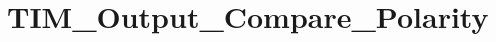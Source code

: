 \hypertarget{group___t_i_m___output___compare___polarity}{\section{T\-I\-M\-\_\-\-Output\-\_\-\-Compare\-\_\-\-Polarity}
\label{group___t_i_m___output___compare___polarity}
}
